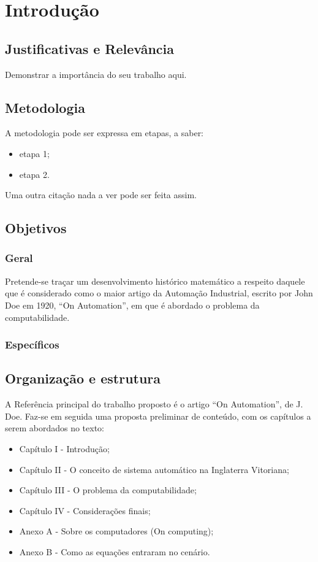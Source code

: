 \documentclass[
	12pt,				%
	openright,			%
	twoside,			%
	a4paper,			%
	english,			%
	brazil				%
	]{abntex2}
\begin{document}
\chapter[Introdução]{Introdução}

\section{Justificativas e Relevância}
Demonstrar a importância do seu trabalho aqui.

\section{Metodologia}
A metodologia pode ser expressa em etapas, a saber:
	\begin{itemize}
		\item etapa 1;
		\item etapa 2.
	\end{itemize}


Uma outra citação nada a ver pode ser feita assim.\cite[p.~12]{herao}


\section{Objetivos}

\subsection{Geral}
Pretende-se traçar um desenvolvimento histórico matemático a respeito daquele que é considerado como o maior artigo da Automação Industrial, escrito por John Doe em 1920, ``On Automation'', em que é abordado o problema da computabilidade.

\subsection{Específicos}

\section{Organização e estrutura}

A Referência principal do trabalho proposto é o artigo ``On Automation'', de J. Doe. Faz-se em seguida uma proposta preliminar de conteúdo, com os capítulos a serem abordados no texto:
\begin{itemize}
\item Capítulo I - Introdução;
\item Capítulo II - O conceito de sistema automático na Inglaterra Vitoriana;
\item Capítulo III - O problema da computabilidade;
\item Capítulo IV - Considerações finais;
\item Anexo A - Sobre os computadores (On computing);
\item Anexo B - Como as equações entraram no cenário.
\end{itemize}
\end{document}

